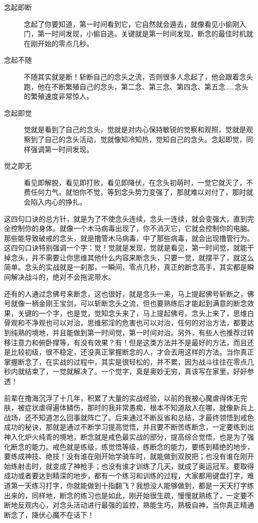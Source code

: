 \begin{description}
    \item[念起即断] 念起了你要知道，第一时间看到它，它自然就会遁去，就像看见小偷刚入门，第一时间发现，小偷自逃。关键就是第一时间发现，断念的最佳时机就在刚开始的零点几秒。
    \item[念起不随] 不随其实就是断！斩断自己的念头之流，否则很多人念起了，他会跟着念头跑，他在不断繁殖自己的念头，第二念、第三念、第四念、第五念……念头的繁殖速度非常惊人。
    \item[念起即觉] 觉就是看到了自己的念头，觉就是对内心保持敏锐的觉察和观照，觉就是观察到了自己的念头活动，觉就像知冷知热，觉知自己的念头。念起即觉，同样强调第一时间发现。
    \item[觉之即无] 看见即解脱，看见即打败，看见即降伏，在念头初萌时，一觉它就灭了，不费任何力气。就怕你不觉，等到念头势力变强了，那就难以对付了，那时就会陷入内心的挣扎。
\end{description}

这四句口诀的总方针，就是为了不使念头连续，念头一连续，就会变强大，直到完全控制你的身体。就像一个木马病毒出现了，你不消灭它，它就会控制你的电脑。那些能导致破戒的念头，就是撸管木马病毒，中了那些病毒，就会出现撸管行为。这四句口诀特别强调一个字：觉！觉就是发现，觉就是看见，第一时间觉，就能干掉念头，并不需要让你思维其他什么内容来断念头，只要一觉，就摆平了，就这么简单。念头的实战就是一刹那，一瞬间，零点几秒，真正的断念高手，其实都是瞬间解决战斗的，绝对不会拖泥带水。

还有的人通过念佛号来断念，这也很好，就是念头一来，马上提起佛号斩断之，佛号就像一柄金刚王宝剑，可以斩断念头之流，但也要熟练后才能起到满意的断念效果，关键的一个字，也是觉，觉知念头来了，马上提起佛号。念头上来了，思维白骨观和不净观也可以对治，思维邪淫的危害也可以对治，任何的对治方法，都要达到纯熟的境地，并且能做到第一时间觉，第一时间对治。另外，有些人也推荐过转移注意力和俯卧撑等，有没有效果？有！但是这类方法并不是最好的方法，而且还是比较初级，很不稳定，还没真正掌握断念的人，才会去用这样的方法。当你真正掌握断念了，在实战的过程中，其实是很轻松的，并不累，因为战斗往往在零点几秒内就结束了，一觉就解决了。一个觉字，真是奥妙无穷，真该写在家里，好好参透！

前辈在撸海沉浮了十几年，积累了大量的实战经验，以前的我被心魔虐得体无完肤，被症状虐得遍体鳞伤，那时的我非常愚痴，根本不知道敌人在哪，就像新兵上战场，还不知道怎么回事就阵亡了。后来通过不断反省和总结，才最终领悟到戒色成功的秘诀，那就是通过不断学习提高觉悟，并且要不断苦练断念，一定要练到出神入化炉火纯青的境地，断念就是戒色最实战的部分，提高综合觉悟，也是为了强化断念的能力。戒色就是练级，练觉悟等级，练断念的能力，要练到精绝的地步，要练成神技、绝技！没有谁在刚开始学骑车时，就能做到双脱把；也没有谁在刚开始练射击时，就变成了神枪手；也没有谁才训练了几天，就成了奥运冠军。要取得成功或者要达到精深的地步，都有一个练习和训练的过程，大家都用键盘打字，难道第一天练习打字，你就能做到十指翻飞？我想没人能够做到，都是一天天打字练出来的，同样地，断念的练习也是如此，刚开始很生疏，慢慢就熟练了，一定要不断地反观内心，对念头活动进行最强的监控，熟能生巧，熟极自神，当你真正精通断念了，降伏心魔不在话下！


